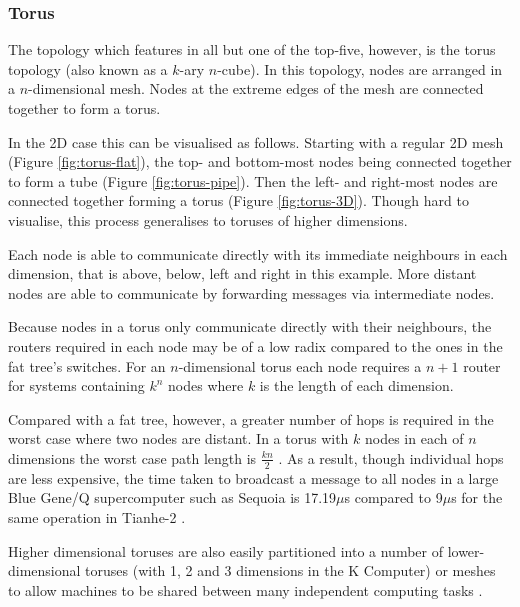 			\subsubsection{Torus}
			
				The topology which features in all but one of the top-five, however, is
				the torus topology (also known as a $k$-ary $n$-cube). In this topology,
				nodes are arranged in a $n$-dimensional mesh. Nodes at the extreme edges
				of the mesh are connected together to form a torus.
				
				In the 2D case this can be visualised as follows. Starting with a
				regular 2D mesh (Figure \ref{fig:torus-flat}), the top- and bottom-most
				nodes being connected together to form a tube (Figure
				\ref{fig:torus-pipe}).  Then the left- and right-most nodes are
				connected together forming a torus (Figure \ref{fig:torus-3D}). Though
				hard to visualise, this process generalises to toruses of higher
				dimensions.
				
				Each node is able to communicate directly with its immediate neighbours
				in each dimension, that is above, below, left and right in this example.
				More distant nodes are able to communicate by forwarding messages via
				intermediate nodes.
				
				Because nodes in a torus only communicate directly with their
				neighbours, the routers required in each node may be of a low radix
				compared to the ones in the fat tree's switches. For an $n$-dimensional
				torus each node requires a $n+1$ router for systems containing $k^n$
				nodes where $k$ is the length of each dimension.
				
				Compared with a fat tree, however, a greater number of hops is required
				in the worst case where two nodes are distant. In a torus with $k$ nodes
				in each of $n$ dimensions the worst case path length is $\frac{kn}{2}$
				\cite{dally04}. As a result, though individual hops are less expensive,
				the time taken to broadcast a message to all nodes in a large Blue Gene/Q
				supercomputer such as Sequoia is 17.19$\mu$s compared to 9$\mu$s for the
				same operation in Tianhe-2 \cite{morozov12}.
				
				Higher dimensional toruses are also easily partitioned into a number of
				lower-dimensional toruses (with 1, 2 and 3 dimensions in the K Computer)
				or meshes to allow machines to be shared between many independent
				computing tasks \cite{yokokawa11,chen11}.
				
